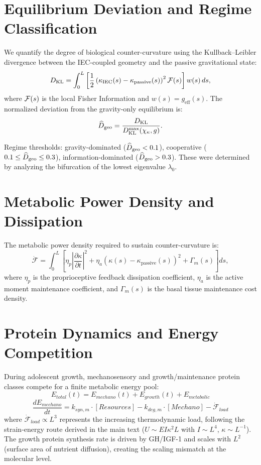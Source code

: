 \section{Equilibrium Deviation and Regime Classification}

We quantify the degree of biological counter-curvature using the Kullback--Leibler divergence between the IEC-coupled geometry and the passive gravitational state:
\begin{equation}
D_{\mathrm{KL}} = \int_0^L \left[ \frac{1}{2} \left( \kappa_{\mathrm{IEC}}(s) - \kappa_{\mathrm{passive}}(s) \right)^2 \mathcal{F}(s) \right] w(s)\, ds,
\end{equation}
where $\mathcal{F}(s)$ is the local Fisher Information and $w(s) = g_{\mathrm{eff}}(s)$. The normalized deviation from the gravity-only equilibrium is:
\begin{equation}
\widehat{D}_{\mathrm{geo}} = \frac{D_{\mathrm{KL}}}{D_{\mathrm{KL}}^{\mathrm{max}}(\chi_\kappa, g)}.
\end{equation}

Regime thresholds: gravity-dominated ($\widehat{D}_{\mathrm{geo}} < 0.1$), cooperative ($0.1 \leq \widehat{D}_{\mathrm{geo}} \leq 0.3$), information-dominated ($\widehat{D}_{\mathrm{geo}} > 0.3$). These were determined by analyzing the bifurcation of the lowest eigenvalue $\lambda_0$.

\section{Metabolic Power Density and Dissipation}

The metabolic power density required to sustain counter-curvature is:
\begin{equation}
\dot{\mathcal{F}} = \int_0^L \left[ \eta_p \left|\frac{\partial \kappa}{\partial t}\right|^2 + \eta_a \left(\kappa(s) - \kappa_{\mathrm{passive}}(s)\right)^2 + \Gamma_m(s) \right] ds,
\end{equation}
where $\eta_p$ is the proprioceptive feedback dissipation coefficient, $\eta_a$ is the active moment maintenance coefficient, and $\Gamma_m(s)$ is the basal tissue maintenance cost density.

\section{Protein Dynamics and Energy Competition}

During adolescent growth, mechanosensory and growth/maintenance protein classes compete for a finite metabolic energy pool:
\begin{equation}
E_{total}(t) = E_{mechano}(t) + E_{growth}(t) + E_{metabolic}
\end{equation}
\begin{equation}
\frac{dE_{mechano}}{dt} = k_{syn,m} \cdot [Resources] - k_{deg,m} \cdot [Mechano] - \dot{\mathcal{F}}_{load}
\end{equation}
where $\dot{\mathcal{F}}_{load} \propto L^3$ represents the increasing thermodynamic load, following the strain-energy route derived in the main text ($U \sim EI\kappa^2 L$ with $I \sim L^4$, $\kappa \sim L^{-1}$). The growth protein synthesis rate is driven by GH/IGF-1 and scales with $L^2$ (surface area of nutrient diffusion), creating the scaling mismatch at the molecular level.

